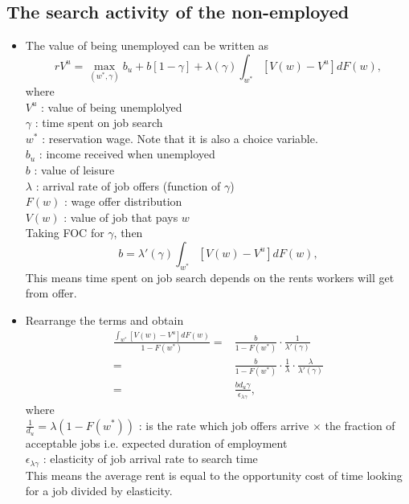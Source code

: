 \documentclass[a4paper, 12pt]{article}
\begin{document}
\subsection{The search activity of the non-employed}
\begin{itemize}
\item The value of being unemployed can be written as
\begin{equation}
rV^u = \max_{(w^*,\gamma)}
b_u + b[1-\gamma]
+\lambda(\gamma)
\int_{w^*}
[V(w)-V^u]dF(w),
\end{equation}
where \\
$V^u$ : value of being unemplolyed \\
$\gamma$ : time spent on job search \\
$w^*$ : reservation wage. Note that it is also a choice variable.\\
$b_u$ : income received when unemployed \\
$b$ : value of leisure \\
$\lambda$ : arrival rate of job offers (function of $\gamma$) \\
$F(w)$ : wage offer distribution \\
$V(w)$ : value of job that pays $w$ \\

Taking FOC for $\gamma$, then
\begin{equation}
b = \lambda'(\gamma)
\int_{w^*}
[V(w)-V^u]dF(w),
\end{equation}
 This means time spent on job search depends on the rents workers will get from offer. 
\item Rearrange the terms and obtain
\begin{align*}
\frac{\int_{w^*}
[V(w)-V^u]dF(w)}
{1-F(w^*)}
=&
\frac{b}{1-F(w^*)}
\cdot
\frac{1}{\lambda'(\gamma)}\\
=&
\frac{b}{1-F(w^*)}
\cdot
\frac{1}{\lambda}
\cdot
\frac{\lambda}{\lambda ' (\gamma)}\\
=&
\frac{bd_u \gamma}{\epsilon_{\lambda \gamma}},
\end{align*}
where \\
$\frac{1}{d_u}=\lambda(1-F(w^*))$ : is the rate which job offers arrive $\times$ the fraction of acceptable jobs i.e. expected duration of employment \\
$\epsilon_{\lambda \gamma}$ : elasticity of job arrival rate to search time\\
This means the average rent is equal to the opportunity cost of time looking for a job divided by elasticity.


\end{itemize}
\end{document}
